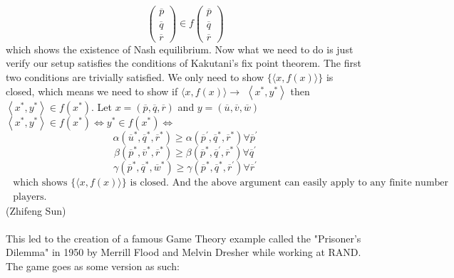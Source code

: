 \documentclass[12pt]{article}
\begin{document}
 	\[\left( \begin{array} { c } { \overline { p } } \\ { \overline { q } } \\ { \overline { r } } \end{array} \right) \in f \left( \begin{array} { c } { \overline { p } } \\ { \overline { q } } \\ { \overline { r } } \end{array} \right)\]
 	which shows the existence of Nash equilibrium. Now what we need to do is just verify our setup
 	satisfies the conditions of Kakutani's fix point theorem. The first two conditions are trivially
 	satisfied. We only need to show $\{ \langle x , f ( x ) \rangle \}$ is closed, which means we need to show if $\langle x , f ( x ) \rangle \rightarrow$ $\left\langle x ^ { * } , y ^ { * } \right\rangle$ then $\left\langle x ^ { * } , y ^ { * } \right\rangle \in f \left( x ^ { * } \right) .$ Let $x = ( \overline { p } , \overline { q } , \overline { r } )$ and $y = ( \overline { u } , \overline { v } , \overline { w } )$\\
 	$\left\langle x ^ { * } , y ^ { * } \right\rangle \in f \left( x ^ { * } \right) \Leftrightarrow y ^ { * } \in f \left( x ^ { * } \right) \Leftrightarrow$ \[\alpha \left( \overline { u } ^ { * } , \overline { q } ^ { * } , \overline { r } ^ { * } \right) \geq \alpha \left( \overline { p } ^ { \prime } , \overline { q } ^ { * } , \overline { r } ^ { * } \right) \forall \overline { p } ^ { \prime }\]
 	\[\beta \left( \overline { p } ^ { * } , \overline { v } ^ { * } , \overline { r } ^ { * } \right) \geq \beta \left( \overline { p } ^ { * } , \overline { q } ^ { \prime } , \overline { r } ^ { * } \right) \forall \overline { q } ^ { \prime }\]
 	\[	\gamma \left( \overline { p } ^ { * } , \overline { q } ^ { * } , \overline { w } ^ { * } \right) \geq \gamma \left( \overline { p } ^ { * } , \overline { q } ^ { * } , \overline { r } ^ { \prime } \right) \forall \overline { r } ^ { \prime }\]
$ 	\begin{array} { l } { \text { which shows } \{ \langle x , f ( x ) \rangle \} \text { is closed. And the above argument can easily apply to any finite number } } \\ { \text { players. } } \end{array} $\\
 	(Zhifeng Sun)\\
 	\\
 	This led to the creation of a famous Game Theory example called the "Prisoner's Dilemma" in 1950 by Merrill Flood and Melvin Dresher while working at RAND. The game goes as some version as such: \\
\end{document}
